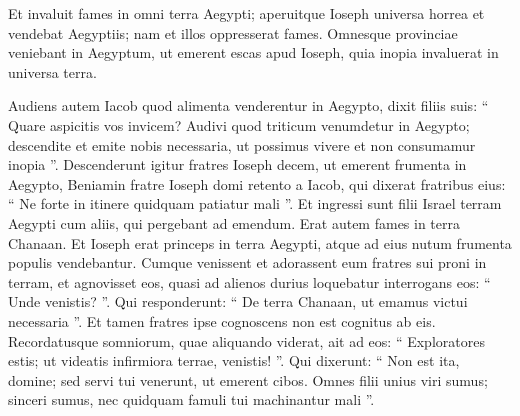 \begin{biblechapter}
\begin{biblechapter}
\begin{biblechapter}
\begin{biblechapter}
\begin{biblechapter}
\begin{biblechapter}
\begin{biblechapter}
\begin{biblechapter}
\begin{biblechapter}
\begin{biblechapter}
\begin{biblechapter}
\begin{biblechapter}
\begin{biblechapter}
\begin{biblechapter}
\begin{biblechapter}
\begin{biblechapter}
\begin{biblechapter}
\begin{biblechapter}
\begin{biblechapter}
\begin{biblechapter}
\begin{biblechapter}
\begin{biblechapter}
\begin{biblechapter}
\begin{biblechapter}
\begin{biblechapter}
\begin{biblechapter}
\begin{biblechapter}
\begin{biblechapter}
\begin{biblechapter}
\begin{biblechapter}
\begin{biblechapter}
\begin{biblechapter}
\begin{biblechapter}
\begin{biblechapter}
\begin{biblechapter}
\begin{biblechapter}
\begin{biblechapter}
\begin{biblechapter}
\begin{biblechapter}
\begin{biblechapter}
\begin{biblechapter}
\verse Et invaluit fames in omni terra Aegypti; aperuitque Ioseph universa horrea et vendebat Aegyptiis; nam et illos oppresserat fames. 
\verse Omnesque provinciae veniebant in Aegyptum, ut emerent escas apud Ioseph, quia inopia invaluerat in universa terra.
 
\begin{biblechapter}
\verse Audiens autem Iacob quod alimenta venderentur in Aegypto, dixit filiis suis: “ Quare aspicitis vos invicem? 
\verse Audivi quod triticum venumdetur in Aegypto; descendite et emite nobis necessaria, ut possimus vivere et non consumamur inopia ”.
 \verse Descenderunt igitur fratres Ioseph decem, ut emerent frumenta in Aegypto, 
 \verse Beniamin fratre Ioseph domi retento a Iacob, qui dixerat fratribus eius: “ Ne forte in itinere quidquam patiatur mali ”. 
\verse Et ingressi sunt filii Israel terram Aegypti cum aliis, qui pergebant ad emendum. Erat autem fames in terra Chanaan.
 \verse Et Ioseph erat princeps in terra Aegypti, atque ad eius nutum frumenta populis vendebantur. Cumque venissent et adorassent eum fratres sui proni in terram, 
 \verse et agnovisset eos, quasi ad alienos durius loquebatur interrogans eos: “ Unde venistis? ”. Qui responderunt: “ De terra Chanaan, ut emamus victui necessaria ”.
 \verse Et tamen fratres ipse cognoscens non est cognitus ab eis. 
\verse Recordatusque somniorum, quae aliquando viderat, ait ad eos: “ Exploratores estis; ut videatis infirmiora terrae, venistis! ”. 
\verse Qui dixerunt: “ Non est ita, domine; sed servi tui venerunt, ut emerent cibos. 
\verse Omnes filii unius viri sumus; sinceri sumus, nec quidquam famuli tui machinantur mali ”. 

\end{biblechapter}
\end{biblechapter}
\end{biblechapter}
\end{biblechapter}
\end{biblechapter}
\end{biblechapter}
\end{biblechapter}
\end{biblechapter}
\end{biblechapter}
\end{biblechapter}
\end{biblechapter}
\end{biblechapter}
\end{biblechapter}
\end{biblechapter}
\end{biblechapter}
\end{biblechapter}
\end{biblechapter}
\end{biblechapter}
\end{biblechapter}
\end{biblechapter}
\end{biblechapter}
\end{biblechapter}
\end{biblechapter}
\end{biblechapter}
\end{biblechapter}
\end{biblechapter}
\end{biblechapter}
\end{biblechapter}
\end{biblechapter}
\end{biblechapter}
\end{biblechapter}
\end{biblechapter}
\end{biblechapter}
\end{biblechapter}
\end{biblechapter}
\end{biblechapter}
\end{biblechapter}
\end{biblechapter}
\end{biblechapter}
\end{biblechapter}
\end{biblechapter}
\end{biblechapter}
